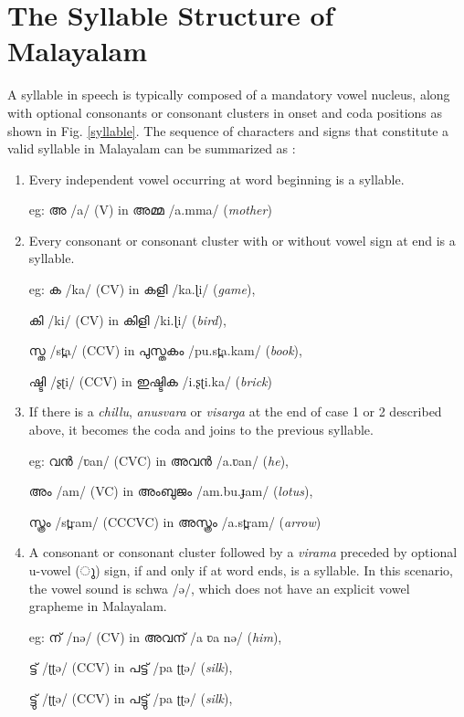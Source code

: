 \documentclass{ieeeaccess}
\begin{document}
\section{The Syllable Structure of Malayalam}
\label{syllablestructure}


A syllable in speech is typically composed of a mandatory vowel nucleus, along with optional consonants or consonant clusters in onset and coda positions as shown in Fig. \ref{syllable}. The sequence of characters and signs that constitute a valid syllable in Malayalam can be summarized as \cite{mohanan1989syllable,prabo2016}:
\begin{enumerate}
	\item Every independent vowel occurring at word beginning is a syllable.

	      eg: {\mal അ} {\ipa /a/} (V) in {\mal അമ്മ} {\ipa /a.mma/} (\textit{mother})
	\item Every consonant or consonant cluster with or without vowel sign at end is a syllable.

	      eg: {\mal ക} {\ipa /ka/} (CV) in {\mal കളി} {\ipa /ka.ɭi/} (\textit{game}),

	      {\mal കി} {\ipa /ki/ }(CV) in {\mal കിളി} {\ipa /ki.ɭi/} (\textit{bird}),

	      {\mal സ്ത} {\ipa /st̪a/} (CCV) in {\mal പുസ്തകം} {\ipa /pu.st̪a.kam/} (\textit{book}),

	      {\mal ഷ്ടി} {\ipa /ʂʈi/} (CCV) in {\mal ഇഷ്ടിക} {\ipa /i.ʂʈi.ka/} (\textit{brick})


	\item If there is a \textit{chillu}, \textit{anusvara} or \textit{visarga} at the end of case 1 or 2 described above, it becomes the coda and joins to the previous syllable.

	      eg: {\mal വൻ} {\ipa /ʋan/} (CVC) in {\mal അവൻ}  {\ipa /a.ʋan/ }(\textit{he}),

	      {\mal അം} {\ipa /am/} (VC) in {\mal അംബുജം} {\ipa /am.bu.ɟam/} (\textit{lotus}),

	      {\mal സ്ത്രം} {\ipa /st̪ram/} (CCCVC) in {\mal അസ്ത്രം} {\ipa /a.st̪ram/} (\textit{arrow})


	\item A consonant or consonant cluster followed by a \textit{virama} preceded by optional u-vowel ({\mal  ു}) sign, if and only if at word ends, is a syllable. In this scenario, the vowel sound is schwa {\ipa /ə/}, which does not have an explicit vowel grapheme in Malayalam.

	      eg:  {\mal ന്} {\ipa /nə/} (CV) in {\mal അവന്} {\ipa /a ʋa nə/} (\textit{him}),

	      {\mal ട്ട്} {\ipa /ʈʈə/} (CCV) in {\mal പട്ട്} {\ipa /pa ʈʈə/} (\textit{silk}),

	      {\mal ട്ടു്} {\ipa /ʈʈə/} (CCV) in {\mal പട്ടു്} {\ipa /pa ʈʈə/} (\textit{silk}),

\end{enumerate}
\end{document}
